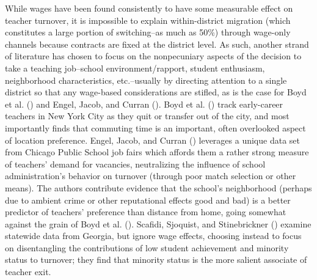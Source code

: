 While wages have been found consistently to have some measurable effect
on teacher turnover, it is impossible to explain within-district
migration (which constitutes a large portion of switching--as much as
50\%) through wage-only channels because contracts are fixed at the
district level. As such, another strand of literature has chosen to
focus on the nonpecuniary aspects of the decision to take a teaching
job--school environment/rapport, student enthusiasm, neighborhood
characteristics, etc.--usually by directing attention to a single
district so that any wage-based considerations are stifled, as is the
case for Boyd et al. (\citeyear{boyd2005}) and Engel,
Jacob, and Curran (\citeyear{engel}). Boyd et al.
(\citeyear{boyd2005}) track early-career teachers in
New York City as they quit or transfer out of the city, and most
importantly finds that commuting time is an important, often overlooked
aspect of location preference. Engel, Jacob, and Curran
(\citeyear{engel}) leverages a unique data set from
Chicago Public School job fairs which affords them a rather strong
measure of teachers' demand for vacancies, neutralizing the influence of
school administration's behavior on turnover (through poor match
selection or other means). The authors contribute evidence that the
school's neighborhood (perhaps due to ambient crime or other
reputational effects good and bad) is a better predictor of teachers'
preference than distance from home, going somewhat against the grain of
Boyd et al. (\citeyear{boyd2005}). Scafidi, Sjoquist,
and Stinebrickner (\citeyear{scafidi}) examine
statewide data from Georgia, but ignore wage effects, choosing instead
to focus on disentangling the contributions of low student achievement
and minority status to turnover; they find that minority status is the
more salient associate of teacher exit.

